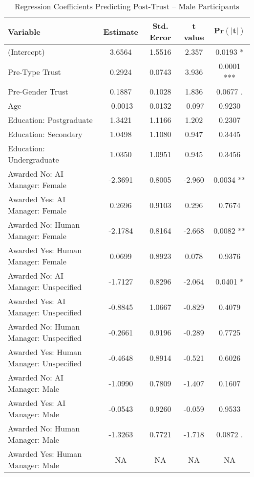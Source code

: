 \begin{table}[ht]
    \centering
    \caption{Regression Coefficients Predicting Post-Trust -- Male Participants}
    \begin{tabular}{lcccc}
        \toprule
        \textbf{Variable} & \textbf{Estimate} & \textbf{Std. Error} & \textbf{t value} & 
        $\mathbf{\text{Pr}(|t|)}$
        \\
        \midrule
        (Intercept) & 3.6564  & 1.5516  & 2.357  & 0.0193 *  \\
        Pre-Type Trust & 0.2924  & 0.0743  & 3.936  & 0.0001 ***  \\
        Pre-Gender Trust & 0.1887  & 0.1028  & 1.836  & 0.0677 .  \\
        Age & -0.0013  & 0.0132  & -0.097  & 0.9230  \\
        Education: Postgraduate & 1.3421  & 1.1166  & 1.202  & 0.2307  \\
        Education: Secondary & 1.0498  & 1.1080  & 0.947  & 0.3445  \\
        Education: Undergraduate & 1.0350  & 1.0951  & 0.945  & 0.3456  \\
        Awarded No: AI Manager: Female & -2.3691  & 0.8005  & -2.960  & 0.0034 **  \\
        Awarded Yes: AI Manager: Female & 0.2696  & 0.9103  & 0.296  & 0.7674  \\
        Awarded No: Human Manager: Female & -2.1784  & 0.8164  & -2.668  & 0.0082 **  \\
        Awarded Yes: Human Manager: Female & 0.0699  & 0.8923  & 0.078  & 0.9376  \\
        Awarded No: AI Manager: Unspecified & -1.7127  & 0.8296  & -2.064  & 0.0401 *  \\
        Awarded Yes: AI Manager: Unspecified & -0.8845  & 1.0667  & -0.829  & 0.4079  \\
        Awarded No: Human Manager: Unspecified & -0.2661  & 0.9196  & -0.289  & 0.7725  \\
        Awarded Yes: Human Manager: Unspecified & -0.4648  & 0.8914  & -0.521  & 0.6026  \\
        Awarded No: AI Manager: Male & -1.0990  & 0.7809  & -1.407  & 0.1607  \\
        Awarded Yes: AI Manager: Male & -0.0543  & 0.9260  & -0.059  & 0.9533  \\
        Awarded No: Human Manager: Male & -1.3263  & 0.7721  & -1.718  & 0.0872 .  \\
        Awarded Yes: Human Manager: Male & NA  & NA  & NA  & NA  \\

\end{tabular}
\end{table}
